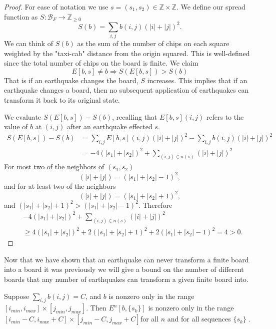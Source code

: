 \documentclass[runningheads,a4paper]{llncs}
\begin{document}
\begin{proof}
For ease of notation we use $s=(s_1, s_2) \in \mathbb{Z} \times \mathbb{Z}$. We define our spread function as $S: \mathcal{B}_F \rightarrow \mathbb{Z}_{\geq 0}$ 
\begin{equation*}
S(b) = \sum_{i,j} b(i,j)(|i|+|j|)^2. 
\end{equation*}
We can think of $S(b)$ as the sum of the number of chips on each square weighted by the "taxi-cab" distance from the origin squared. This is well-defined since the total number of chips on the board is finite. We claim 
\begin{equation*}
E[b, s] \neq b \Rightarrow S(E[b, s]) > S(b)
\end{equation*}
That is if an earthquake changes the board, $S$ increases. This implies that if an earthquake changes a board, then no subsequent application of earthquakes can transform it back to its original state.

We evaluate $S(E[b, s]) - S(b)$, recalling that $E[b, s](i,j)$ refers to the value of $b$ at $(i,j)$ after an earthquake effected $s$.
\begin{align*}
S(E[b, s]) - S(b) &=\sum_{i,j} E[b, s](i,j)(|i|+|j|)^2 - \sum_{i,j} b(i,j)(|i|+|j|)^2 \\
&=-4(|s_1| + |s_2|)^2 +\sum_{(i,j) \in n(s)} (|i| + |j|)^2
\end{align*}
For most two of the neighbors of $(s_1, s_2)$ 
\begin{equation*}
(|i|+|j|)= (|s_1|+|s_2|-1)^2,
\end{equation*}
and for at least two of the neighbors 
\begin{equation*}
(|i|+|j|)=(|s_1|+|s_2|+1)^2,
\end{equation*}
 and $(|s_1|+|s_2|+1)^2 > (|s_1|+|s_2|-1)^2$. Therefore 
\begin{align*}
&-4(|s_1| + |s_2|)^2 +\sum_{(i,j) \in n(s)} (|i| + |j|)^2 \\
& \geq 4(|s_1| + |s_2|)^2 + 2 (|s_1| + |s_2|+1)^2 + 2 (|s_1| + |s_2|-1)^2 = 4 >0.
\end{align*}
\end{proof}

Now that we have shown that an earthquake can never transform a finite board into a board it was previously we will give a bound on the number of different boards that any number of earthquakes can transform a given finite board into.
\begin{lemma}
\label{finiteextension}
Suppose $\sum_{i,j} b(i,j) = C$, and $b$ is nonzero only in the range $[i_{min}, i_{max}] \times [j_{min}, j_{max}]$. Then   $E^n[b, \{s_k\}]$ is nonzero only in the range $[i_{min}-C, i_{max}+C] \times [j_{min}-C, j_{max}+C]$for all $n$ and for all sequences $\{s_k\}$ .
\end{lemma}
\end{document}
